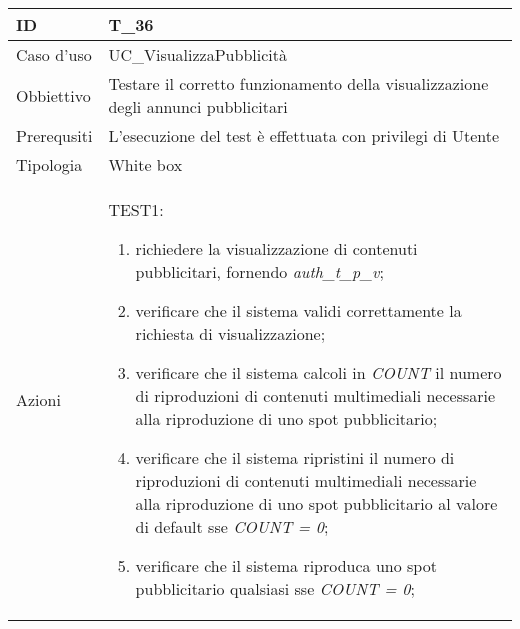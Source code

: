 \begin{table}[hb]
    \centering
    \begin{tabular}{ |p{2cm}|p{10cm}|  }
        \hline
        ID          & T\_36                                                                              \\\hline
        Caso d'uso  & UC\_VisualizzaPubblicità                                                           \\\hline
        Obbiettivo  & Testare il corretto funzionamento della visualizzazione degli annunci pubblicitari \\\hline
        Prerequsiti & L'esecuzione del test è effettuata con privilegi di Utente                         \\\hline
        Tipologia   & White box                                                                          \\\hline
        Azioni      &
        TEST1:
        \begin{enumerate}[nosep, topsep=0pt]
            \item richiedere la visualizzazione di contenuti pubblicitari, fornendo \emph{auth\_t\_p\_v};
            \item verificare che il sistema validi correttamente la richiesta di visualizzazione;
            \item verificare che il sistema calcoli in \emph{COUNT} il numero di riproduzioni di contenuti multimediali necessarie alla riproduzione di uno spot pubblicitario;
            \item verificare che il sistema ripristini il numero di riproduzioni di contenuti multimediali necessarie alla riproduzione di uno spot pubblicitario al valore di default sse \emph{COUNT = 0};
            \item verificare che il sistema riproduca uno spot pubblicitario qualsiasi sse \emph{COUNT = 0};
        \end{enumerate}
        \\\hline
    \end{tabular}
\end{table}

